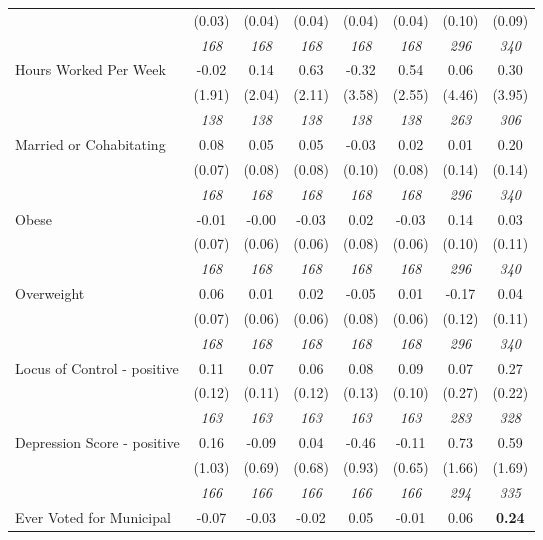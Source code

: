 \begin{tabular}{l c c c c c c c}
& (0.03) & (0.04) & (0.04) & (0.04) & (0.04) & (0.10) & (0.09) \\
& \textit{ 168 } & \textit{ 168 } & \textit{ 168 } & \textit{ 168 } & \textit{ 168 } & \textit{ 296 } & \textit{ 340 } \\
Hours Worked Per Week & -0.02 & 0.14 & 0.63 & -0.32 & 0.54 & 0.06 & 0.30 \\
& (1.91) & (2.04) & (2.11) & (3.58) & (2.55) & (4.46) & (3.95) \\
& \textit{ 138 } & \textit{ 138 } & \textit{ 138 } & \textit{ 138 } & \textit{ 138 } & \textit{ 263 } & \textit{ 306 } \\
Married or Cohabitating & 0.08 & 0.05 & 0.05 & -0.03 & 0.02 & 0.01 & 0.20 \\
& (0.07) & (0.08) & (0.08) & (0.10) & (0.08) & (0.14) & (0.14) \\
& \textit{ 168 } & \textit{ 168 } & \textit{ 168 } & \textit{ 168 } & \textit{ 168 } & \textit{ 296 } & \textit{ 340 } \\
Obese & -0.01 & -0.00 & -0.03 & 0.02 & -0.03 & 0.14 & 0.03 \\
& (0.07) & (0.06) & (0.06) & (0.08) & (0.06) & (0.10) & (0.11) \\
& \textit{ 168 } & \textit{ 168 } & \textit{ 168 } & \textit{ 168 } & \textit{ 168 } & \textit{ 296 } & \textit{ 340 } \\
Overweight & 0.06 & 0.01 & 0.02 & -0.05 & 0.01 & -0.17 & 0.04 \\
& (0.07) & (0.06) & (0.06) & (0.08) & (0.06) & (0.12) & (0.11) \\
& \textit{ 168 } & \textit{ 168 } & \textit{ 168 } & \textit{ 168 } & \textit{ 168 } & \textit{ 296 } & \textit{ 340 } \\
Locus of Control - positive & 0.11 & 0.07 & 0.06 & 0.08 & 0.09 & 0.07 & 0.27 \\
& (0.12) & (0.11) & (0.12) & (0.13) & (0.10) & (0.27) & (0.22) \\
& \textit{ 163 } & \textit{ 163 } & \textit{ 163 } & \textit{ 163 } & \textit{ 163 } & \textit{ 283 } & \textit{ 328 } \\
Depression Score - positive & 0.16 & -0.09 & 0.04 & -0.46 & -0.11 & 0.73 & 0.59 \\
& (1.03) & (0.69) & (0.68) & (0.93) & (0.65) & (1.66) & (1.69) \\
& \textit{ 166 } & \textit{ 166 } & \textit{ 166 } & \textit{ 166 } & \textit{ 166 } & \textit{ 294 } & \textit{ 335 } \\
Ever Voted for Municipal & -0.07 & -0.03 & -0.02 & 0.05 & -0.01 & 0.06 & \textbf{ 0.24 } \\

\end{tabular}
